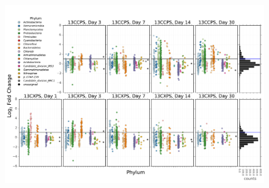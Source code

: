 \begin{figure}[H]
	\begin{center}
	\centerline{\includegraphics[width=11.4cm]{figures/l2fc_fig1/l2fc_fig.pdf}}
	\caption{\protect}\label{fig:l2fc}
        \end{center}
\end{figure}

\restoregeometry
